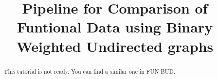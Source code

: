 \documentclass[justified]{tufte-handout}
\title{Pipeline for Comparison of Funtional Data using Binary Weighted Undirected graphs}
\begin{document}
\maketitle

\begin{abstract}
\noindent
This tutorial is not ready. You can find a similar one in FUN BUD.
\end{abstract}
\end{document}
